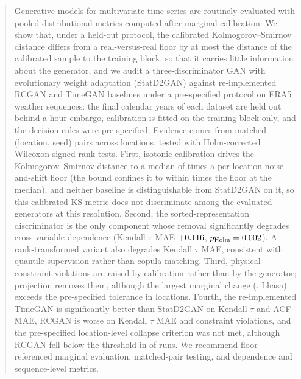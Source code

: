 \documentclass[preprint,12pt]{elsarticle}
\begin{document}
\begin{frontmatter}
\begin{abstract}
Generative models for multivariate time series are routinely
evaluated with pooled distributional metrics computed after marginal
calibration. We show that, under a held-out protocol, the calibrated
Kolmogorov--Smirnov distance differs from a real-versus-real floor by at
most the distance of the calibrated sample to the training block, so that
it carries little information about the generator, and we audit a
three-discriminator GAN with evolutionary weight adaptation (StatD2GAN)
against re-implemented RCGAN and TimeGAN baselines under a pre-specified
protocol on ERA5 weather sequences: the final \protoValYearsWord{} calendar years of each
dataset are held out behind a \protoEmbargoHours{} hour embargo,
calibration is fitted on the training block only, and the decision rules
were pre-specified. Evidence comes from \nPairs{} matched (location,
seed) pairs across \nLocsProtoWord{} locations, tested with
Holm-corrected Wilcoxon signed-rank tests. First, isotonic calibration
drives the Kolmogorov--Smirnov distance to a median of
\ksRatioFullMedian{} times a per-location noise-and-shift floor (the
bound confines it to within \phDistRatioMed{} times the floor at the
median), and
neither baseline is distinguishable from StatD2GAN on it, so this calibrated KS metric does not discriminate among the evaluated
generators at this resolution. Second, the
sorted-representation discriminator is the only component whose removal
significantly degrades cross-variable dependence (Kendall $\tau$ MAE
$+\medNoDSortedTau$, $p_{\mathrm{Holm}}\pHolmRelNoDSortedTau$). A
rank-transformed variant also degrades Kendall $\tau$ MAE, consistent
with quantile supervision rather than copula matching. Third, physical
constraint violations are raised by calibration rather than by the
generator; projection removes them, although the largest marginal change
(\dKsMaxLhasa{}, Lhasa) exceeds the pre-specified tolerance in
\phDKsLocsOverThrWord{} locations. Fourth, the
re-implemented TimeGAN is significantly better than StatD2GAN on Kendall
$\tau$ and ACF MAE, RCGAN is worse on Kendall $\tau$ MAE and constraint
violations, and the pre-specified location-level collapse criterion was
not met, although RCGAN fell below the threshold in
\phSeedsBelowTenRcgan{} of \phSeedsPerModel{} runs. We recommend
floor-referenced marginal evaluation, matched-pair testing, and
dependence and sequence-level metrics.
\end{abstract}


\end{frontmatter}
\end{document}
